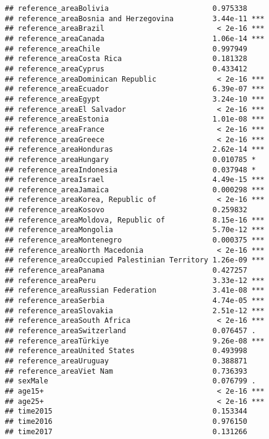 \documentclass[
]{article}
\begin{document}
\begin{verbatim}
## reference_areaBolivia                        0.975338    
## reference_areaBosnia and Herzegovina         3.44e-11 ***
## reference_areaBrazil                          < 2e-16 ***
## reference_areaCanada                         1.06e-14 ***
## reference_areaChile                          0.997949    
## reference_areaCosta Rica                     0.181328    
## reference_areaCyprus                         0.433412    
## reference_areaDominican Republic              < 2e-16 ***
## reference_areaEcuador                        6.39e-07 ***
## reference_areaEgypt                          3.24e-10 ***
## reference_areaEl Salvador                     < 2e-16 ***
## reference_areaEstonia                        1.01e-08 ***
## reference_areaFrance                          < 2e-16 ***
## reference_areaGreece                          < 2e-16 ***
## reference_areaHonduras                       2.62e-14 ***
## reference_areaHungary                        0.010785 *  
## reference_areaIndonesia                      0.037948 *  
## reference_areaIsrael                         4.49e-15 ***
## reference_areaJamaica                        0.000298 ***
## reference_areaKorea, Republic of              < 2e-16 ***
## reference_areaKosovo                         0.259832    
## reference_areaMoldova, Republic of           8.15e-16 ***
## reference_areaMongolia                       5.70e-12 ***
## reference_areaMontenegro                     0.000375 ***
## reference_areaNorth Macedonia                 < 2e-16 ***
## reference_areaOccupied Palestinian Territory 1.26e-09 ***
## reference_areaPanama                         0.427257    
## reference_areaPeru                           3.33e-12 ***
## reference_areaRussian Federation             3.41e-08 ***
## reference_areaSerbia                         4.74e-05 ***
## reference_areaSlovakia                       2.51e-12 ***
## reference_areaSouth Africa                    < 2e-16 ***
## reference_areaSwitzerland                    0.076457 .  
## reference_areaTürkiye                        9.26e-08 ***
## reference_areaUnited States                  0.493998    
## reference_areaUruguay                        0.388871    
## reference_areaViet Nam                       0.736393    
## sexMale                                      0.076799 .  
## age15+                                        < 2e-16 ***
## age25+                                        < 2e-16 ***
## time2015                                     0.153344    
## time2016                                     0.976150    
## time2017                                     0.131266    

\end{verbatim}
\end{document}
